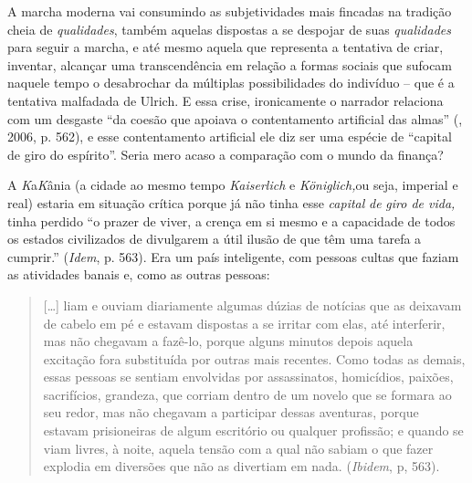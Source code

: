 A marcha moderna vai consumindo as subjetividades mais fincadas na
tradição cheia de \emph{qualidades}, também aquelas dispostas a se
despojar de suas \emph{qualidades} para seguir a marcha, e até mesmo
aquela que representa a tentativa de criar, inventar, alcançar uma
transcendência em relação a formas sociais que sufocam naquele tempo o
desabrochar da múltiplas possibilidades do indivíduo -- que é a
tentativa malfadada de Ulrich. E essa crise, ironicamente o narrador
relaciona com um desgaste ``da coesão que apoiava o contentamento
artificial das almas'' (, 2006, p. 562), e esse contentamento
artificial ele diz ser uma espécie de ``capital de giro do espírito''.
Seria mero acaso a comparação com o mundo da finança?

A \emph{K}a\emph{K}ânia (a cidade ao mesmo tempo \emph{Kaiserlich} e
\emph{Königlich,}ou seja, imperial e real) estaria em situação crítica
porque já não tinha esse \emph{capital} \emph{de} \emph{giro de vida,}
tinha perdido ``o prazer de viver, a crença em si mesmo e a capacidade
de todos os estados civilizados de divulgarem a útil ilusão de que têm
uma tarefa a cumprir.'' (\emph{Idem}, p. 563). Era um país
inteligente, com pessoas cultas que faziam as atividades banais e, como
as outras pessoas:

\begin{quote}
[\ldots{}] liam e ouviam diariamente algumas dúzias de notícias que as
deixavam de cabelo em pé e estavam dispostas a se irritar com elas, até
interferir, mas não chegavam a fazê-lo, porque alguns minutos depois
aquela excitação fora substituída por outras mais recentes. Como todas
as demais, essas pessoas se sentiam envolvidas por assassinatos,
homicídios, paixões, sacrifícios, grandeza, que corriam dentro de um
novelo que se formara ao seu redor, mas não chegavam a participar dessas
aventuras, porque estavam prisioneiras de algum escritório ou qualquer
profissão; e quando se viam livres, à noite, aquela tensão com a qual
não sabiam o que fazer explodia em diversões que não as divertiam em
nada. (\emph{Ibidem}, p, 563).
\end{quote}

